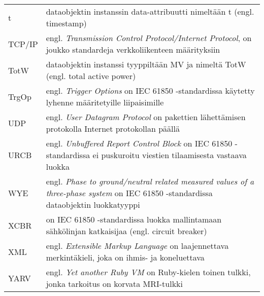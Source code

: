 \begin{tabularx}{\linewidth}[h]{@{} p{} p{} @{}}
	t & dataobjektin instanssin data-attribuutti nimeltään t (engl. timestamp) \\
	TCP/IP & engl. \emph{Transmission Control Protocol/Internet Protocol}, on joukko standardeja verkkoliikenteen määrityksiin \\
	TotW & dataobjektin instanssi tyyppiltään MV ja nimeltä TotW (engl. total active power) \\
	TrgOp & engl. \emph{Trigger Options} on IEC 61850 -standardissa käytetty lyhenne määritetyille liipaisimille \\
	UDP & engl. \emph{User Datagram Protocol} on pakettien lähettämisen protokolla Internet protokollan päällä \\
	URCB & engl. \emph{Unbuffered Report Control Block} on IEC 61850 -standardissa ei puskuroitu viestien tilaamisesta vastaava luokka \\
	WYE & engl. \emph{Phase to ground/neutral related measured values of a three-phase system} on IEC 61850 -standardissa dataobjektin luokkatyyppi \\
	XCBR & on IEC 61850 -standardissa luokka mallintamaan sähkölinjan katkaisijaa (engl. circuit breaker) \\
	XML & engl. \emph{Extensible Markup Language} on laajennettava merkintäkieli, joka on ihmis- ja koneluettava \\
	YARV & engl. \emph{Yet another Ruby VM} on Ruby-kielen toinen tulkki, jonka tarkoitus on korvata MRI-tulkki \\
\end{tabularx}